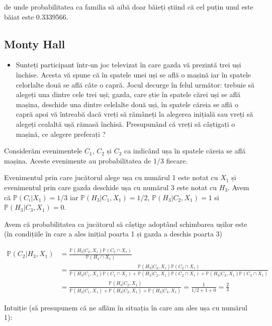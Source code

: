 \documentclass[]{article}
\newenvironment{frshaded*}{%
  \def\FrameCommand{\fboxrule=\FrameRule\fboxsep=\FrameSep \fcolorbox{framecolor}{shadecolor1}}%
  \MakeFramed {\advance\hsize-\width \FrameRestore}}%
{\endMakeFramed}
\newenvironment{rmdblock}[1]
  {\begin{frshaded*}
  \begin{itemize}
  \renewcommand{\labelitemi}{
    \raisebox{-.7\height}[0pt][0pt]{
      {\setkeys{Gin}{width=2em,keepaspectratio}\texttt{[image: images/icons/\#1]}}
    }
  }
  \item
  }
  {
  \end{itemize}
  \end{frshaded*}
  }
\newenvironment{rmdexercise}
  {\begin{rmdblock}{exercise}}
  {\end{rmdblock}}
\begin{document}
de unde probabilitatea ca familia să aibă doar băieți știind că cel
puțin unul este băiat este 0.3339566.

\subsection{Monty Hall}\label{monty-hall}

\begin{rmdexercise}
Sunteți participant într-un joc televizat în care gazda vă prezintă trei
uși închise. Acesta vă spune că în spatele unei uși se află o mașină iar
în spatele celorlalte două se află câte o capră. Jocul decurge în felul
următor: trebuie să alegeți una dintre cele trei uși; gazda, care știe
în spatele cărei uși se află mașina, deschide una dintre celelalte două
uși, în spatele căreia se află o capră apoi vă întreabă dacă vreți să
rămâneți la alegerea inițială sau vreți să alegeți cealaltă ușă rămasă
închisă. Presupunând că vreți să câștigați o mașină, ce alegere
preferați ?
\end{rmdexercise}

Considerăm evenimentele \(C_1\), \(C_2\) și \(C_3\) ca indicând ușa în
spatele căreia se află mașina. Aceste evenimente au probabilitatea de
\(1/3\) fiecare.

Evenimentul prin care jucătorul alege ușa cu numărul 1 este notat cu
\(X_1\) și evenimentul prin care gazda deschide ușa cu numărul 3 este
notat cu \(H_3\). Avem că \(\mathbb{P}(C_i|X_1) = 1/3\) iar
\(\mathbb{P}(H_3|C_1,X_1) = 1/2\), \(\mathbb{P}(H_3|C_2,X_1) = 1\) si
\(\mathbb{P}(H_3|C_3,X_1) = 0\).

Avem că probabilitatea ca jucătorul să câștige adoptând schimbarea
ușilor este (în condițiile în care a ales inițial poarta 1 și gazda a
deschis poarta 3)

\[
\begin{aligned}
  \mathbb{P}(C_2|H_3,X_1) &= \frac{\mathbb{P}(H_3|C_2,X_1)\mathbb{P}(C_2\cap X_1)}{\mathbb{P}(H_3\cap X_1)}\\
  &=\frac{\mathbb{P}(H_3|C_2,X_1)\mathbb{P}(C_2\cap X_1)}{\mathbb{P}(H_3|C_1,X_1)\mathbb{P}(C_1\cap X_1)+\mathbb{P}(H_3|C_2,X_1)\mathbb{P}(C_2\cap X_1)+\mathbb{P}(H_3|C_3,X_1)\mathbb{P}(C_3\cap X_1)}\\
  &= \frac{\mathbb{P}(H_3|C_2,X_1)}{\mathbb{P}(H_3|C_1,X_1)+\mathbb{P}(H_3|C_2,X_1)+\mathbb{P}(H_3|C_3,X_1)} = \frac{1}{1/2+1+0} = \frac{2}{3}
\end{aligned}
\]

Intuiție (să presupunem că ne aflăm în situația în care am ales ușa cu
numărul 1):
\end{document}
